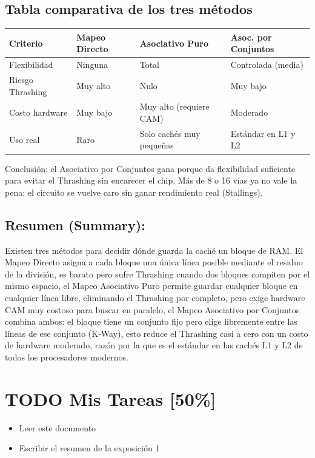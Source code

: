 \documentclass{article}
\begin{document}
\subsection{Tabla comparativa de los tres métodos}
\label{sec:org796cb60}
\begin{center}
\begin{tabular}{llll}
Criterio & Mapeo Directo & Asociativo Puro & Asoc. por Conjuntos\\[0pt]
\hline
Flexibilidad & Ninguna & Total & Controlada (media)\\[0pt]
Riesgo Thrashing & Muy alto & Nulo & Muy bajo\\[0pt]
Costo hardware & Muy bajo & Muy alto (requiere CAM) & Moderado\\[0pt]
Uso real & Raro & Solo cachés muy pequeñas & Estándar en L1 y L2\\[0pt]
\end{tabular}
\end{center}

\alert{Conclusión}: el Asociativo por Conjuntos gana porque da flexibilidad
suficiente para evitar el Thrashing sin encarecer el chip. Más de 8 o
16 vías ya no vale la pena: el circuito se vuelve caro sin ganar
rendimiento real (Stallings).

\subsection{Resumen (Summary):}
\label{sec:org907edb1}
Existen tres métodos para decidir dónde guarda la caché un bloque de
RAM. El \alert{Mapeo Directo} asigna a cada bloque una única línea posible
mediante el residuo de la división, es barato pero sufre Thrashing
cuando dos bloques compiten por el mismo espacio, el \alert{Mapeo Asociativo
Puro} permite guardar cualquier bloque en cualquier línea libre,
eliminando el Thrashing por completo, pero exige hardware CAM muy
costoso para buscar en paralelo, el \alert{Mapeo Asociativo por Conjuntos}
combina ambos: el bloque tiene un conjunto fijo pero elige libremente
entre las líneas de ese conjunto (K-Way), esto reduce el Thrashing
casi a cero con un costo de hardware moderado, razón por la que es el
estándar en las cachés L1 y L2 de todos los procesadores modernos.

\section{{\bfseries\sffamily TODO} Mis Tareas [50\%]}
\label{sec:org2023bd3}
\begin{itemize}
\item[{$\boxtimes$}] Leer este documento
\item[{$\square$}] Escribir el resumen  de la exposición 1
\end{itemize}

\printbibliography
\end{document}
